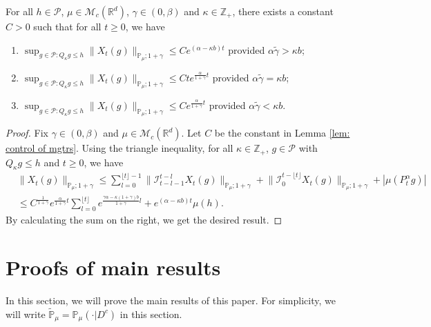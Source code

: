 \documentclass[EJP]{ejpecp} %
\begin{document}
\begin{lemma}
\label{lem:P:M:uc}
	For all $h \in \mathcal P$, $\mu \in \mathcal M_c(\mathbb R^d)$, $\gamma\in (0, \beta)$ and $\kappa \in \mathbb Z_+$, there exists a constant $C > 0$ such that for all $t\geq 0$, we have
\begin{enumerate}
\item\label{item:P:M:uc:1}
    $\sup_{g\in \mathcal P: Q_\kappa g \leq h}\|X_t(g)\|_{\mathbb{P}_{\mu};1+\gamma}\leq C e^{(\alpha-\kappa b)t}$ provided $\alpha \tilde \gamma > \kappa b$;
\item \label{item:P:M:uc:2}
    $\sup_{g\in \mathcal P: Q_\kappa g \leq h}\|X_t(g)\|_{\mathbb{P}_{\mu};1+\gamma}\leq C te^{\frac{\alpha}{1+\gamma}t}$ provided $\alpha \tilde \gamma = \kappa b$;
\item \label{item:P:M:uc:3}
    $\sup_{g\in \mathcal P: Q_\kappa g \leq h} \|X_t(g)\|_{\mathbb{P}_{\mu};1+\gamma}\leq C e^{\frac{\alpha}{1+\gamma}t}$ provided $\alpha \tilde \gamma < \kappa b$.
\end{enumerate}
\end{lemma}

\begin{proof}
	Fix $\gamma \in (0,\beta)$ and $\mu \in \mathcal M_c(\mathbb R^d)$.
	Let $C$ be the constant in Lemma \ref{lem: control of mgtrs}.
	Using the triangle inequality, for all $\kappa\in \mathbb Z_+$, $g \in \mathcal P$ with $Q_\kappa g \leq h$ and $t\geq 0$, we have
\begin{align}
	& \|X_t(g)\|_{\mathbb P_\mu;1+\gamma}
	\leq \sum_{l=0}^{\lfloor t\rfloor - 1}\big\| \mathcal{I}_{t-l-1}^{t-l}X_t(g) \big\|_{\mathbb P_\mu;1+\gamma}+\big\| \mathcal{I}_{0}^{t-\lfloor t \rfloor}X_t(g)  \big\|_{\mathbb P_\mu;1+\gamma} + |\mu(P^\alpha_t g)| \\
	& \leq C^{\frac{1}{1+\gamma}} e^{\frac{\alpha}{1+\gamma}t} \sum_{l=0}^{\lfloor t\rfloor} e^{\frac{\gamma\alpha-\kappa (1+\gamma)b}{1+\gamma} l} + e^{(\alpha - \kappa b)t} \mu(h).
\end{align}
	By calculating the sum on the right, we get the desired result.
\end{proof}

\section{Proofs of main results}
\label{proofs of main results}
	In this section, we will prove the main results of this paper.
	For simplicity, we will write $\mathbb{\widetilde{P}}_{\mu}=\mathbb{P}_{\mu}(\cdot|D^c)$ in this section.
\end{document}
